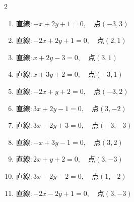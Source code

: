 \begin{multicols}{2}
\begin{enumerate}
        \phantom{$\displaystyle 距離 : 0$}

  \item $直線:-x+2y+1=0,\quad 点 ( -3, 3 )$


  \item $直線:-2x+2y+1=0,\quad 点 ( 2, 1 )$


  \item $直線:x+2y-3=0,\quad 点 ( 3, 1 )$


  \item $直線:x+3y+2=0,\quad 点 ( -3, 1 )$


  \item $直線:-2x+y+2=0,\quad 点 ( -3, 2 )$


  \item $直線:3x+2y-1=0,\quad 点 ( 3, -2 )$


  \item $直線:3x-2y+3=0,\quad 点 ( -3, -3 )$

        \phantom{$\displaystyle 距離 : 0$}

  \item $直線:-x+3y-1=0,\quad 点 ( 3, 2 )$


  \item $直線:2x+y+2=0,\quad 点 ( 3, -3 )$


\columnbreak %

\resetques

  \item $直線:3x-2y-2=0,\quad 点 ( 1, -2 )$


  \item $直線:-2x-2y+1=0,\quad 点 ( 3, -3 )$



\end{enumerate}
\end{multicols}
